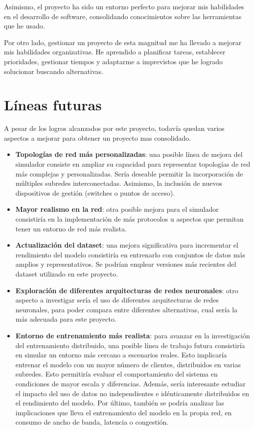 Asimismo, el proyecto ha sido un entorno perfecto para mejorar mis habilidades en el desarrollo de software, consolidando conocimientos sobre las herramientas que he usado.

Por otro lado, gestionar un proyecto de esta magnitud me ha llevado a mejorar mis habilidades organizativas. He aprendido a planificar tareas, establecer prioridades, gestionar tiempos y adaptarme a imprevistos que he logrado solucionar buscando alternativas.

\section{Líneas futuras}
\label{sec:lineas_futuras}
A pesar de los logros alcanzados por este proyecto, todavía quedan varios aspectos a mejorar para obtener un proyecto mas consolidado.

\begin{itemize}
    \item \textbf{Topologías de red más personalizadas}: una posible línea de mejora del simulador consiste en ampliar su capacidad para representar topologías de red más complejas y personalizadas. Sería deseable permitir la incorporación de múltiples subredes interconectadas. Asimismo, la inclusión de nuevos dispositivos de gestión (switches o puntos de acceso).
    \item \textbf{Mayor realismo en la red}: otra posible mejora para el simulador consistiría en la implementación de más protocolos u aspectos que permitan tener un entorno de red más realista.
    \item \textbf{Actualización del dataset}: una mejora significativa para incrementar el rendimiento del modelo consistiría en entrenarlo con conjuntos de datos más amplios y representativos. Se podrían emplear versiones más recientes del dataset utilizado en este proyecto.
    \item \textbf{Exploración de diferentes arquitecturas de redes neuronales}: otro aspecto a investigar sería el uso de diferentes arquitecturas de redes neuronales, para poder compara entre diferentes alternativas, cual sería la más adecuada para este proyecto.
    \item \textbf{Entorno de entrenamiento más realista}: para avanzar en la investigación del entrenamiento distribuido, una posible línea de trabajo futura consistiría en simular un entorno más cercano a escenarios reales. Esto implicaría entrenar el modelo con un mayor número de clientes, distribuidos en varias subredes. Esto permitiría evaluar el comportamiento del sistema en condiciones de mayor escala y diferencias. Además, sería interesante estudiar el impacto del uso de datos no independientes e idénticamente distribuidos en el rendimiento del modelo. Por último, también se podría analizar las implicaciones que lleva el entrenamiento del modelo en la propia red, en consumo de ancho de banda, latencia o congestión.
\end{itemize}
